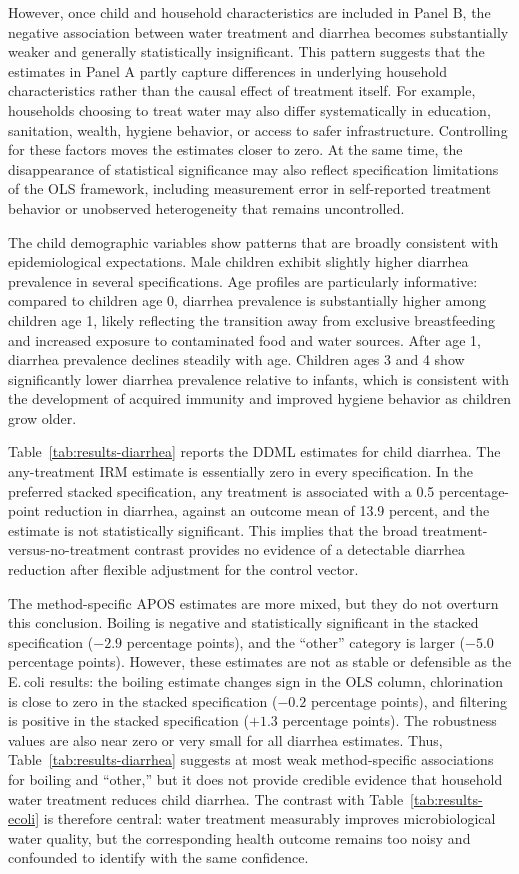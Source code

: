 \documentclass [11pt]{article}
\theoremstyle{plain}
\theoremstyle{definition}
\theoremstyle{remark}
\newcommand{\1}{\bm{1}}
\begin{document}
However, once child and household characteristics are included in Panel B, the negative association between water treatment and diarrhea becomes substantially weaker and generally statistically insignificant. This pattern suggests that the estimates in Panel A partly capture differences in underlying household characteristics rather than the causal effect of treatment itself. For example, households choosing to treat water may also differ systematically in education, sanitation, wealth, hygiene behavior, or access to safer infrastructure. Controlling for these factors moves the estimates closer to zero. At the same time, the disappearance of statistical significance may also reflect specification limitations of the OLS framework, including measurement error in self-reported treatment behavior or unobserved heterogeneity that remains uncontrolled.

The child demographic variables show patterns that are broadly consistent with epidemiological expectations. Male children exhibit slightly higher diarrhea prevalence in several specifications. Age profiles are particularly informative: compared to children age 0, diarrhea prevalence is substantially higher among children age 1, likely reflecting the transition away from exclusive breastfeeding and increased exposure to contaminated food and water sources. After age 1, diarrhea prevalence declines steadily with age. Children ages 3 and 4 show significantly lower diarrhea prevalence relative to infants, which is consistent with the development of acquired immunity and improved hygiene behavior as children grow older.

Table~\ref{tab:results-diarrhea} reports the DDML estimates for child diarrhea. The any-treatment IRM estimate is essentially zero in every specification. In the preferred stacked specification, any treatment is associated with a 0.5 percentage-point reduction in diarrhea, against an outcome mean of 13.9 percent, and the estimate is not statistically significant. This implies that the broad treatment-versus-no-treatment contrast provides no evidence of a detectable diarrhea reduction after flexible adjustment for the control vector.

The method-specific APOS estimates are more mixed, but they do not overturn this conclusion. Boiling is negative and statistically significant in the stacked specification ($-2.9$ percentage points), and the ``other'' category is larger ($-5.0$ percentage points). However, these estimates are not as stable or defensible as the E.\,coli results: the boiling estimate changes sign in the OLS column, chlorination is close to zero in the stacked specification ($-0.2$ percentage points), and filtering is positive in the stacked specification ($+1.3$ percentage points). The robustness values are also near zero or very small for all diarrhea estimates. Thus, Table~\ref{tab:results-diarrhea} suggests at most weak method-specific associations for boiling and ``other,'' but it does not provide credible evidence that household water treatment reduces child diarrhea. The contrast with Table~\ref{tab:results-ecoli} is therefore central: water treatment measurably improves microbiological water quality, but the corresponding health outcome remains too noisy and confounded to identify with the same confidence.
\end{document}
